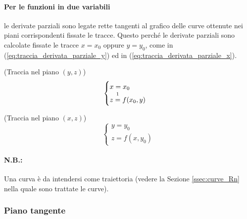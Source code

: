 \paragraph{Per le funzioni in due variabili} le derivate parziali sono legate rette tangenti al grafico delle curve ottenute nei piani corrispondenti fissate le tracce. Questo perché le derivate parziali sono calcolate fissate le tracce $x=x_0$ oppure $y=y_0$, come in (\ref{eq:traccia_derivata_parziale_y}) ed in (\ref{eq:traccia_derivata_parziale_x}).

(Traccia nel piano $(y,z)$)
\begin{equation}\label{eq:traccia_derivata_parziale_y}
    \begin{cases}
        x=x_0\\
        z\overset{\footnotemark}{=}f(x_0,y)
    \end{cases}
\end{equation}

(Traccia nel piano $(x,z)$)
\begin{equation}\label{eq:traccia_derivata_parziale_x}
    \begin{cases}
        y=y_0\\
        z=f(x,y_0)
    \end{cases}
\end{equation}

\paragraph{N.B.:} Una curva è da intendersi come traiettoria (vedere la Sezione \ref{ssec:curve_Rn} nella quale sono trattate le curve).

\subsubsection{Piano tangente}
